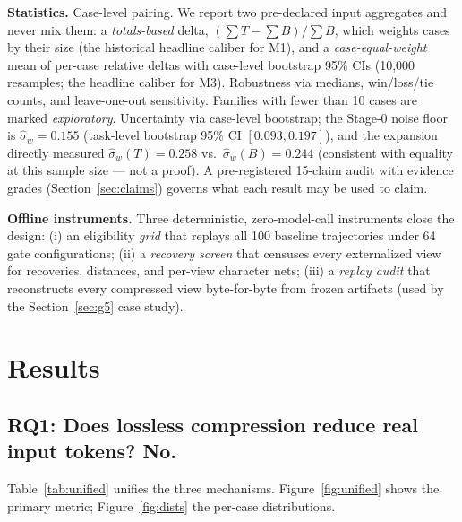 \documentclass[twocolumn]{svjour3}       %
\begin{document}
\textbf{Statistics.} Case-level pairing. We report two pre-declared input aggregates and
never mix them: a \emph{totals-based} delta, $(\sum T - \sum B)/\sum B$, which weights
cases by their size (the historical headline caliber for M1), and a
\emph{case-equal-weight} mean of per-case relative deltas with case-level bootstrap 95\%
CIs (10{,}000 resamples; the headline caliber for M3). Robustness via medians,
win/loss/tie counts, and leave-one-out sensitivity. Families with fewer than 10 cases are
marked \emph{exploratory}. Uncertainty via case-level bootstrap; the Stage-0 noise floor
is $\hat\sigma_w = 0.155$ (task-level bootstrap 95\% CI $[0.093, 0.197]$), and the
expansion directly measured $\hat\sigma_w(T) = 0.258$ vs.\ $\hat\sigma_w(B) = 0.244$
(consistent with equality at this sample size --- not a proof). A pre-registered 15-claim
audit with evidence grades (Section~\ref{sec:claims}) governs what each result may be
used to claim.

\textbf{Offline instruments.} Three deterministic, zero-model-call instruments close the
design: (i) an eligibility \emph{grid} that replays all 100 baseline trajectories under 64
gate configurations; (ii) a \emph{recovery screen} that censuses every externalized view
for recoveries, distances, and per-view character nets; (iii) a \emph{replay audit} that
reconstructs every compressed view byte-for-byte from frozen artifacts (used by the
Section~\ref{sec:g5} case study).

\section{Results}

\subsection{RQ1: Does lossless compression reduce real input tokens? No.}
\label{sec:rq1}

Table~\ref{tab:unified} unifies the three mechanisms. Figure~\ref{fig:unified} shows the
primary metric; Figure~\ref{fig:dists} the per-case distributions.
\end{document}
